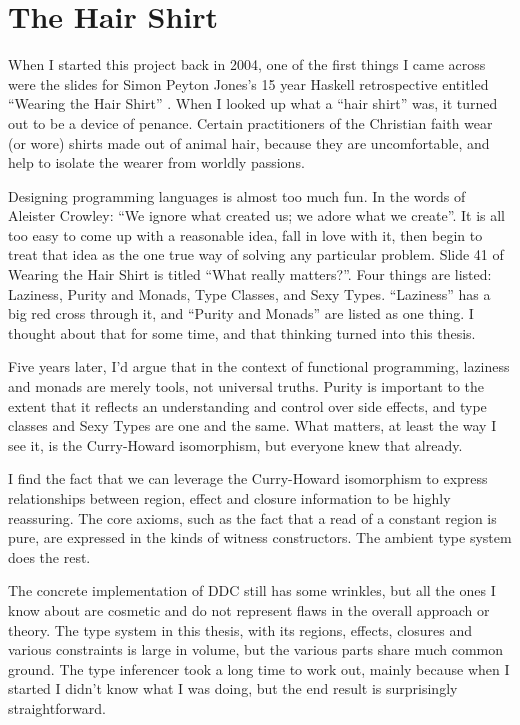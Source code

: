 
\section{The Hair Shirt}

When I started this project back in 2004, one of the first things I came across were the slides for Simon Peyton Jones's 15 year Haskell retrospective entitled ``Wearing the Hair Shirt'' \cite{peyton-jones:wearing-the-hair-shirt}. When I looked up what a ``hair shirt'' was, it turned out to be a device of penance. Certain practitioners of the Christian faith wear (or wore) shirts made out of animal hair, because they are uncomfortable, and help to isolate the wearer from worldly passions.

Designing programming languages is almost too much fun. In the words of Aleister Crowley: ``We ignore what created us; we adore what we create''. It is all too easy to come up with a reasonable idea, fall in love with it, then begin to treat that idea as the one true way of solving any particular problem. Slide 41 of Wearing the Hair Shirt is titled ``What really matters?''. Four things are listed: Laziness, Purity and Monads, Type Classes, and Sexy Types. ``Laziness'' has a big red cross through it, and ``Purity and Monads'' are listed as one thing. I thought about that for some time, and that thinking turned into this thesis.

Five years later, I'd argue that in the context of functional programming, laziness and monads are merely tools, not universal truths. Purity is important to the extent that it reflects an understanding and control over side effects, and type classes and Sexy Types are one and the same. What matters, at least the way I see it, is the Curry-Howard isomorphism, but everyone knew that already.

I find the fact that we can leverage the Curry-Howard isomorphism to express relationships between region, effect and closure information to be highly reassuring. The core axioms, such as the fact that a read of a constant region is pure, are expressed in the kinds of witness constructors. The ambient type system does the rest.

The concrete implementation of DDC still has some wrinkles, but all the ones I know about are cosmetic and do not represent flaws in the overall approach or theory. The type system in this thesis, with its regions, effects, closures and various constraints is large in volume, but the various parts share much common ground. The type inferencer took a long time to work out, mainly because when I started I didn't know what I was doing, but the end result is surprisingly straightforward. 


